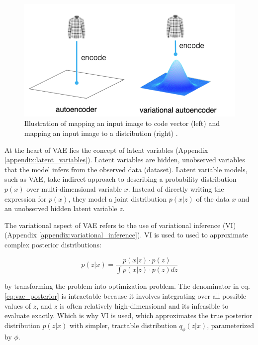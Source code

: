 \begin{figure}[h]
    \centering
    \includegraphics[scale=0.4]{images/autoencoder-vs-variational-autoencoder-point-vs-distribution-768x409.png}
    \caption{Illustration of mapping an input image to code vector (left) and mapping an input image to a distribution (right) \cite{ae_vs_vae}.}
    \label{fig:ae_vs_vae}
\end{figure}

At the heart of VAE lies the concept of latent variables (Appendix \ref{appendix:latent_variables}). Latent variables are hidden, unobserved variables that the model infers from the observed data (dataset). Latent variable models, such as VAE, take indirect approach to describing a probability distribution $p(x)$ over multi-dimensional variable $x$. Instead of directly writing the expression for $p(x)$, they model a joint distribution $p(x|z)$ of the data $x$ and an unobserved hidden latent variable $z$.

The variational aspect of VAE refers to the use of variational inference (VI) (Appendix \ref{appendix:variational_inference}). VI is used to used to approximate complex posterior distributions: 

\begin{equation}
p(z|x) = \frac{p(x|z) \cdot p(z)}{\int p(x|z) \cdot p(z) dz}
\label{eq:vae_posterior}
\end{equation}

by transforming the problem into optimization problem. The denominator in eq. \ref{eq:vae_posterior} is intractable because it involves integrating over all possible values of $z$, and $z$ is often relatively high-dimensional and its infeasible to evaluate exactly. Which is why VI is used, which approximates the true posterior distribution $p(z|x)$ with simpler, tractable distribution $q_\phi (z|x)$, parameterized by $\phi$.

